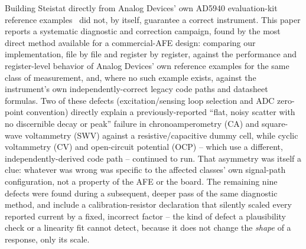 Building Steistat directly from Analog Devices' own AD5940 evaluation-kit
reference examples~\cite{ad5940_examples_github} did not, by itself,
guarantee a correct instrument. This paper reports a systematic
diagnostic and correction campaign, found by the most direct method
available for a commercial-AFE design: comparing our implementation, file
by file and register by register, against the performance and
register-level behavior of Analog Devices' own reference examples for the
same class of measurement, and, where no such example exists, against the
instrument's own independently-correct legacy code paths and datasheet
formulas. Two of these defects (excitation/sensing loop selection and
ADC zero-point convention) directly explain a previously-reported ``flat,
noisy scatter with no discernible decay or peak'' failure in
chronoamperometry (CA) and square-wave voltammetry (SWV) against a
resistive/capacitive dummy cell, while cyclic voltammetry (CV) and
open-circuit potential (OCP) -- which use a different, independently-derived
code path -- continued to run. That asymmetry was itself a clue: whatever
was wrong was specific to the affected classes' own signal-path
configuration, not a property of the AFE or the board. The remaining nine
defects were found during a subsequent, deeper pass of the same diagnostic
method, and include a calibration-resistor declaration that silently
scaled every reported current by a fixed, incorrect factor -- the kind of
defect a plausibility check or a linearity fit cannot detect, because it
does not change the \emph{shape} of a response, only its scale.

